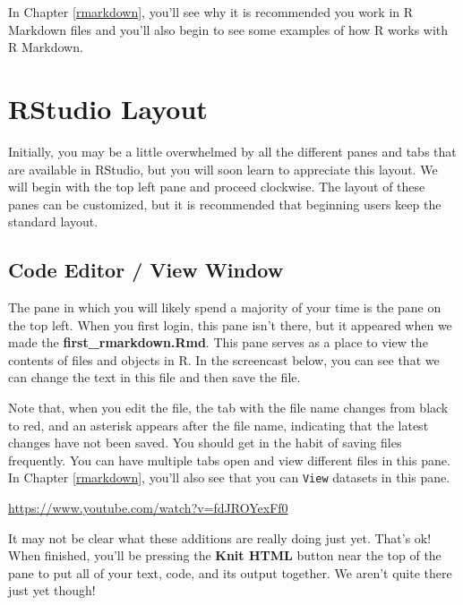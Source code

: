 \documentclass[]{tufte-book}
\begin{document}
In Chapter \ref{rmarkdown}, you'll see why it is recommended you work in R Markdown files and you'll also begin to see some examples of how R works with R Markdown.

\hypertarget{rstudio-layout}{%
\section{RStudio Layout}\label{rstudio-layout}}

Initially, you may be a little overwhelmed by all the different panes and tabs that are available in RStudio, but you will soon learn to appreciate this layout. We will begin with the top left pane and proceed clockwise. The layout of these panes can be customized, but it is recommended that beginning users keep the standard layout.

\hypertarget{code-editor-view-window}{%
\subsection{Code Editor / View Window}\label{code-editor-view-window}}

The pane in which you will likely spend a majority of your time is the pane on the top left. When you first login, this pane isn't there, but it appeared when we made the \textbf{first\_rmarkdown.Rmd}. This pane serves as a place to view the contents of files and objects in R. In the screencast below, you can see that we can change the text in this file and then save the file.

Note that, when you edit the file, the tab with the file name changes from black to red, and an asterisk appears after the file name, indicating that the latest changes have not been saved. You should get in the habit of saving files frequently. You can have multiple tabs open and view different files in this pane. In Chapter \ref{rmarkdown}, you'll also see that you can \texttt{View} datasets in this pane.

\vspace{0.1in}\begin{center}\footnotesize{\url{https://www.youtube.com/watch?v=fdJROYexFf0}}\end{center}\vspace{0.1in}

It may not be clear what these additions are really doing just yet. That's ok! When finished, you'll be pressing the \textbf{Knit HTML} button near the top of the pane to put all of your text, code, and its output together. We aren't quite there just yet though!
\end{document}

